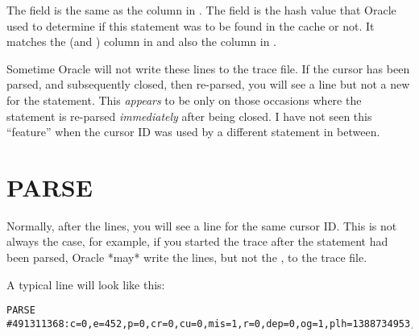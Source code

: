 The  field is the same as the  column in . The  field is the hash value that Oracle used to determine if this statement was to be found in the cache or not. It matches the  (and ) column in  and also the  column in .

Sometime Oracle will not write these lines to the trace file. If the cursor has been parsed, and subsequently closed, then re-parsed, you will see a  line but not a new  for the statement. This \emph{appears} to be only on those occasions where the statement is re-parsed \emph{immediately} after being closed. I have not seen this ``feature'' when the cursor ID was used by a different statement in between.

\newpage\section{PARSE}\label{parse}

Normally, after the  lines, you will see a  line for the same cursor ID. This is not always the case, for example, if you started the trace after the statement had been parsed, Oracle *may* write the  lines, but not the , to the trace file.

A typical  line will look like this:

\begin{lstlisting}[numbers=none,caption={Parse Line}]
PARSE #491311368:c=0,e=452,p=0,cr=0,cu=0,mis=1,r=0,dep=0,og=1,plh=1388734953,tim=97734887542
\end{lstlisting}

